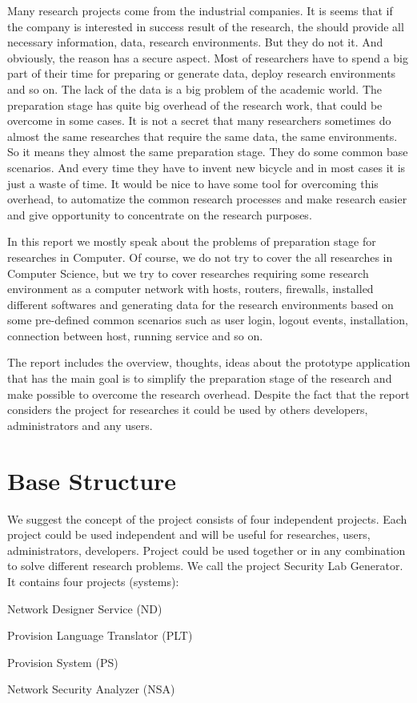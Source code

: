 \documentclass[twoside]{article}
\newcommand{\myProjectName}{Security Lab Generator}
\newcommand{\myNDS}{Network Designer Service}
\newcommand{\myPLT}{Provision Language Translator}
\newcommand{\myPS}{Provision System}
\newcommand{\myNSA}{Network Security Analyzer}
\begin{document}
Many research projects come from the industrial companies. It is seems that if the company is interested in success result of the research, the should provide all necessary information, data, research environments. But they do not it. And obviously, the reason has a secure aspect. Most of researchers have to spend a big part of their time for preparing or generate data, deploy research environments and so on. The lack of the data is a big problem of the academic world. The preparation stage has quite big overhead of the research work, that could be overcome in some cases. It is not a secret that many researchers sometimes do almost the same researches that require the same data, the same environments. So it means they almost the same preparation stage. They do some common base scenarios. And every time they have to invent new bicycle and in most cases it is just a waste of time. It would be nice to have some tool for overcoming this overhead, to automatize the common research processes and make research easier and give opportunity to concentrate on the research purposes. 

In this report we mostly speak about the problems of preparation stage for researches in Computer. Of course, we do not try to cover the all researches in Computer Science, but we try to cover researches requiring some research environment as a computer network with hosts, routers, firewalls, installed different softwares and generating data for the research environments based on some pre-defined common scenarios such as user login, logout events, installation, connection between host, running service and so on. 

The report includes the overview, thoughts, ideas about the prototype application that has the main goal is to simplify the preparation stage of the research and make possible to overcome the research overhead. Despite the fact that the report considers the project for researches it could be used by others developers, administrators and any users. 

\section{Base Structure}
We suggest the concept of the project consists of four independent projects. Each project could be used independent and will be useful for researches, users, administrators, developers. Project could be used together or in any combination to solve different research problems. We call the project \myProjectName. 
It contains four projects (systems): 
\begin{compactitem}
\item \myNDS{ } (ND)
\item \myPLT{ } (PLT)
\item \myPS{ } (PS)
\item \myNSA{ } (NSA)
\end{compactitem}
\end{document}
